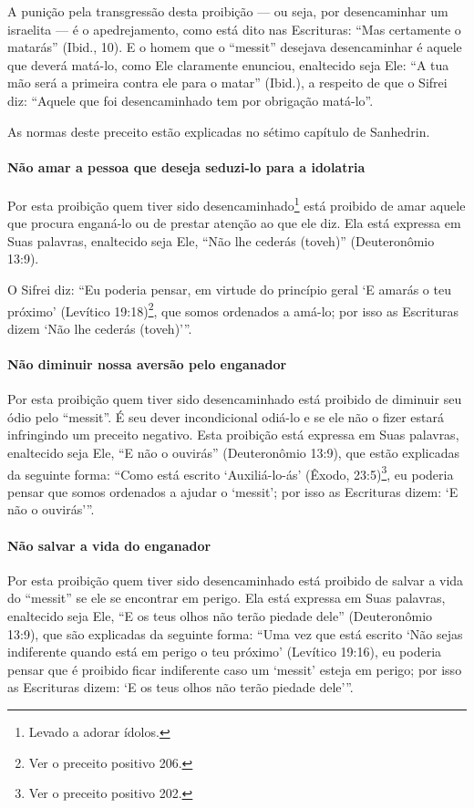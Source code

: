 A punição pela transgressão desta proibição --- ou seja, por
desencaminhar um israelita --- é o apedrejamento, como está dito nas
Escrituras: ``Mas certamente o matarás'' (Ibid., 10). E o homem que o
``messit'' desejava desencaminhar é aquele que deverá matá-lo, como Ele
claramente enunciou, enaltecido seja Ele: ``A tua mão será a primeira
contra ele para o matar'' (Ibid.), a respeito de que o Sifrei diz:
``Aquele que foi desencaminhado tem por obrigação matá-lo''.

As normas deste preceito estão explicadas no sétimo capítulo de Sanhedrin.

\paragraph{Não amar a pessoa que deseja seduzi-lo para a idolatria}

Por esta proibição quem tiver sido desencaminhado\footnote{Levado a adorar ídolos.} está proibido
de amar aquele que procura enganá-lo ou de prestar atenção ao que ele
diz. Ela está expressa em Suas palavras, enaltecido seja Ele, ``Não lhe
cederás (toveh)'' (Deuteronômio 13:9).

O Sifrei diz: ``Eu poderia pensar, em virtude do princípio geral `E
amarás o teu próximo' (Levítico 19:18)\footnote{Ver o preceito positivo 206.}, que somos
ordenados a amá-lo; por isso as Escrituras dizem `Não lhe cederás
(toveh)'''.

\paragraph{Não diminuir nossa aversão pelo enganador}

Por esta proibição quem tiver sido desencaminhado está proibido de
diminuir seu ódio pelo ``messit''. É seu dever incondicional odiá-lo e
se ele não o fizer estará infringindo um preceito negativo. Esta
proibição está expressa em Suas palavras, enaltecido seja Ele, ``E não
o ouvirás'' (Deuteronômio 13:9), que estão explicadas da seguinte forma:
``Como está escrito `Auxiliá-lo-ás' (Êxodo, 23:5)\footnote{Ver o preceito positivo 202.}, eu poderia pensar que somos ordenados a ajudar o `messit'; por isso as Escrituras dizem: `E não o ouvirás'''.

\paragraph{Não salvar a vida do enganador}

Por esta proibição quem tiver sido desencaminhado está proibido de
salvar a vida do ``messit'' se ele se encontrar em perigo. Ela está
expressa em Suas palavras, enaltecido seja Ele, ``E os teus olhos não
terão piedade dele'' (Deuteronômio 13:9), que são explicadas da seguinte
forma: ``Uma vez que está escrito `Não sejas indiferente quando está em
perigo o teu próximo' (Levítico 19:16), eu poderia pensar que é
proibido ficar indiferente caso um `messit' esteja em perigo; por isso
as Escrituras dizem: `E os teus olhos não terão piedade dele'''.

